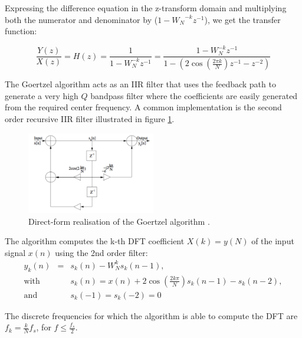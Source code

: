 \documentclass[12pt,a4paper,openright]{report}
\begin{document}
Expressing the difference equation in the z-transform domain and multiplying both the numerator and denominator by (${1 - {W_N}^{ - k}{z^{ - 1}}}$), we get the transfer function:

\begin{equation}
\frac{{Y(z)}}{{X(z)}} = H(z) = \frac{1}{{1 - {W_N^{ - k}}{z^{ - 1}}}} = \frac{{1 - W_N^{ - k}{z^{ - 1}}}}{{1 - (2\cos (\frac{{2\pi k}}{N}){z^{ - 1}} - {z^{ - 2}})}}
\end{equation}

The Goertzel algorithm acts as an IIR filter that uses the feedback path to generate a very high $Q$ bandpass filter where the coefficients are easily generated from the required center frequency. A common implementation is the second order recursive IIR filter illustrated in figure \ref{fig:IIR}. 

 \begin{figure}[H]
  \centering
    \includegraphics[width=0.5\textwidth]{IIR.pdf}
    \caption[Direct-form realisation of the Goertzel algorithm]{Direct-form realisation of the Goertzel algorithm \protect\cite{HaykinBook}.}
    \label{fig:IIR}
\end{figure}


The algorithm computes the k-th DFT coefficient $X(k)=y(N)$ of the input signal $x(n)$ using the 2nd order filter:
\begin{equation}
\begin{array}{lll}
{y_k}(n) & = & {s_k}(n) - W_N^k{s_k}(n - 1),\\
\text{with } & &{s_k}(n) = x(n) + 2\cos (\frac{{2k\pi }}{N}){s_k}(n - 1) - {s_k}(n - 2),\\
\text{and } & & {s_k}( - 1) = {s_k}( - 2) = 0

\end{array}
\label{fig:IIRtime}
\end{equation}

The discrete frequencies for which the algorithm is able to compute the DFT are ${f_k} = \frac{k}{N}{f_s}$, for $f \leq \frac{f_s}{2}$.
\end{document}
